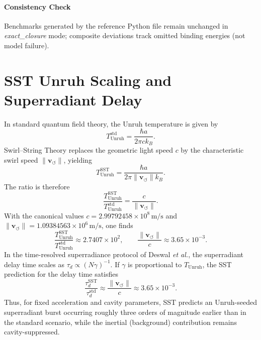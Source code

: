 \documentclass[10pt,reprint,aps,onecolumn,nofootinbib]{revtex4-2}
\newcommand{\vswirl}{\mathbf{v}_{\!\boldsymbol{\circlearrowleft}}}
\begin{document}
    \paragraph{Consistency Check}
        Benchmarks generated by the reference Python file remain unchanged in \emph{exact\_closure} mode; composite deviations track omitted binding energies (not model failure).



    \section*{SST Unruh Scaling and Superradiant Delay}

    In standard quantum field theory, the Unruh temperature is given by
    \begin{equation}
        T_{\text{Unruh}}^{\text{std}} =
        \frac{\hbar a}{2\pi c k_B}.
    \end{equation}
    Swirl--String Theory replaces the geometric light speed $c$ by the
    characteristic swirl speed $\lVert\vswirl\rVert$, yielding
    \begin{equation}
        T_{\text{Unruh}}^{\text{SST}} =
        \frac{\hbar a}{2\pi \lVert\vswirl\rVert k_B}.
    \end{equation}
    The ratio is therefore
    \begin{equation}
        \frac{T_{\text{Unruh}}^{\text{SST}}}{T_{\text{Unruh}}^{\text{std}}}
        = \frac{c}{\lVert\vswirl\rVert}.
    \end{equation}
    With the canonical values $c = 2.99792458\times 10^{8}\,\mathrm{m/s}$
    and $\lVert\vswirl\rVert = 1.09384563\times 10^{6}\,\mathrm{m/s}$, one finds
    \begin{equation}
        \frac{T_{\text{Unruh}}^{\text{SST}}}{T_{\text{Unruh}}^{\text{std}}}
        \approx 2.7407\times 10^{2},
        \qquad
        \frac{\lVert\vswirl\rVert}{c} \approx 3.65\times 10^{-3}.
    \end{equation}
    In the time-resolved superradiance protocol of Deswal \emph{et al.},
    the superradiant delay time scales as $\tau_d \propto (N\gamma)^{-1}$.
    If $\gamma$ is proportional to $T_{\text{Unruh}}$, the SST prediction
    for the delay time satisfies
    \begin{equation}
        \frac{\tau_d^{\text{SST}}}{\tau_d^{\text{std}}}
        \approx \frac{\lVert\vswirl\rVert}{c}
        \approx 3.65\times 10^{-3}.
    \end{equation}
    Thus, for fixed acceleration and cavity parameters, SST predicts an
    Unruh-seeded superradiant burst occurring roughly three orders of
    magnitude earlier than in the standard scenario, while the inertial
    (background) contribution remains cavity-suppressed.
\end{document}
